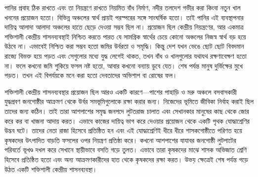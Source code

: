 পানির প্রবাহ ঠিক রাখতে এবং তা নিয়ন্ত্রণে রাখতে নিয়মিত বাঁধ নির্মাণ, নদীর তলদেশ গভীর করা কিংবা নতুন খাল খননের প্রয়োজন হতো।
বিভিন্ন অঞ্চলের স্বার্থ প্রায়ই পরস্পরের সঙ্গে সাংঘর্ষিক হতো। তাই পানির এই ব্যবস্থাপনার দায়িত্ব আলাদা আলাদা অঞ্চলের হাতে ছেড়ে দেওয়া সম্ভব ছিল না। প্রয়োজন ছিল কেন্দ্রীয় নিয়ন্ত্রণের, আর একমাত্র শক্তিশালী কেন্দ্রীয় শাসনব্যবস্থাই নিশ্চিত করতে পারত যে সামগ্রিক স্বার্থের চেয়ে কোনো অঞ্চলের নিজস্ব স্বার্থ বড় হয়ে উঠবে না। এভাবেই নিশ্চিত করা সম্ভব হতো জমির উর্বরতা ও সমৃদ্ধি।
কিন্তু দেশ যখন ভেঙে ছোট ছোট বিবদমান রাজ্যে বিভক্ত হয়ে পড়ত এবং সেগুলোর মধ্যে যুদ্ধ লেগেই থাকত, তখন বাঁধ ও খালগুলোর যথাযথ রক্ষণাবেক্ষণ হতো না। ফলে কখনো জমি শুকিয়ে ফসল নষ্ট হতো, আবার কখনো বন্যায় ডুবে যেত। শেষ পর্যন্ত মানুষ দুর্ভিক্ষের মুখে পড়ত। তখন এই বিপর্যয়কে মনে করা হতো দেবতাদের অভিশাপ বা রোষের ফল।



শক্তিশালী কেন্দ্রীয় শাসনব্যবস্থার প্রয়োজন ছিল আরও একটি কারণে—পাশের পাহাড়ি ও মরু অঞ্চলে বসবাসকারী যুদ্ধপ্রবণ জনগোষ্ঠীর আক্রমণ থেকে উর্বর সমভূমিগুলোকে রক্ষা করার জন্য।
নিজেদের ভূমিতে জীবিকা নির্বাহ করাই ছিল তাদের জন্য কঠিন। তাই তারা আশপাশের সমৃদ্ধ জনপদে লুটতরাজ চালাত এবং সেখানকার মানুষের কাছ থেকে জোর করে কর বা খাজনা আদায় করত।
এভাবে কাজের দায়িত্ব ভাগ করে দেওয়ার প্রয়োজন থেকে একটি পৃথক যোদ্ধাশ্রেণির উদ্ভব ঘটে। তাদের নেতা রাজা হিসেবে প্রতিষ্ঠিত হন এবং এই যোদ্ধাশ্রেণিই ধীরে ধীরে শাসকগোষ্ঠীতে পরিণত হয়ে কৃষকদের উৎপাদিত বাড়তি ফসলের ওপর নিয়ন্ত্রণ প্রতিষ্ঠা করে।
কখনো আশপাশের যাযাবর জনগোষ্ঠী লুটপাটের পরিবর্তে ভূখণ্ড দখল করে সেখানে স্থায়ীভাবে বসতি গড়ে তুলত। এভাবে তারা কৃষকদের মাঝে শাসক অভিজাত শ্রেণি হিসেবে প্রতিষ্ঠিত হতো এবং অন্য আক্রমণকারীদের হাত থেকে কৃষকদের রক্ষা করত। উভয় ক্ষেত্রেই শেষ পর্যন্ত গড়ে উঠত একটি শক্তিশালী কেন্দ্রীয় শাসনব্যবস্থা।



